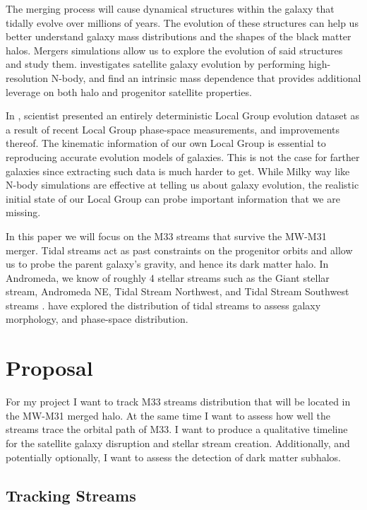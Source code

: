 \documentclass{aastex63}
\begin{document}
The merging process will cause dynamical structures within the galaxy that
tidally evolve over millions of years. The evolution of these 
structures can help us better understand galaxy mass distributions and the 
shapes of the black matter halos. Mergers simulations 
allow us to explore the evolution of said structures and study them. 
\citet{2007MNRAS.381..987C} investigates satellite galaxy evolution by 
performing high-resolution N-body, and find an intrinsic mass dependence
that provides additional leverage on both halo and progenitor satellite 
properties. 

In \citep{2012ApJ...753....9V}, scientist presented an entirely deterministic
Local Group evolution dataset as a result of recent Local Group phase-space 
measurements, and improvements thereof. The kinematic information of our own 
Local Group is essential to reproducing accurate evolution models of galaxies.
This is not the case for farther galaxies since extracting such data is much 
harder to get. While Milky way like N-body simulations are effective at telling
us about galaxy evolution, the realistic initial state of our Local Group can
probe important information that we are missing.

In this paper we will focus on the M33 streams that survive the MW-M31 merger.
Tidal streams act as past constraints on the progenitor orbits and allow us to
probe the parent galaxy's gravity, and hence its dark matter halo. In Andromeda, 
we know of roughly 4 stellar streams such as the Giant stellar 
stream, Andromeda NE, Tidal Stream Northwest, and Tidal Stream Southwest 
streams \citep{2010AAS...21535401G, 2006AAS...208.4803G}. \citet{2007MNRAS.381..987C, 2017MNRAS.464.2882A} have explored the distribution of tidal streams to assess galaxy morphology, and phase-space distribution.

\section{Proposal} \label{sec:proposal}

For my project I want to track M33 streams distribution that will be located 
in the MW-M31 merged halo. At the same time I want to assess how well the streams 
trace the orbital path of M33. I want to produce a qualitative timeline for the satellite galaxy disruption and stellar stream creation. Additionally, and potentially optionally, I want to assess the detection of dark matter subhalos.

\subsection{Tracking Streams\label{subsec:streams}}
\end{document}
